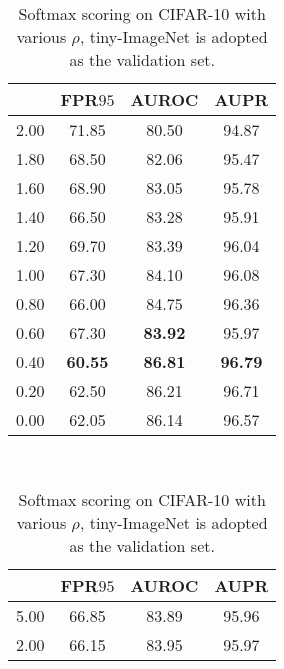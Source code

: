 \documentclass{article}
\begin{document}
\begin{table}[t]
\centering
\parbox{.30\linewidth}{
\centering
\scriptsize
\caption{Softmax scoring on CIFAR-$10$ with various $\sigma_1$, tiny-ImageNet is adopted as the validation set.} \label{tab: 38}
\vspace{5pt}
{
\begin{tabular}{c|ccc}
\toprule[1.5pt]
             & FPR$95$     & AUROC       & AUPR      \\
\midrule[0.6pt]
2.00               & 71.85                  & 80.50                  & 94.87      \\
1.80               & 68.50                  & 82.06                  & 95.47      \\
1.60               & 68.90                  & 83.05                  & 95.78       \\
1.40               & 66.50                  & 83.28                  & 95.91      \\
1.20               & 69.70                  & 83.39                  & 96.04      \\
1.00               & 67.30                  & 84.10                  & 96.08 \\ 
0.80               & 66.00                  & 84.75                  & 96.36 \\
0.60               & {67.30}                  & \textbf{83.92}                  & 95.97 \\ 
\cellcolor{greyC}0.40               & \cellcolor{greyC}\textbf{60.55}                  & \cellcolor{greyC}\textbf{86.81}                  & \cellcolor{greyC}\textbf{96.79}  \\
0.20               & 62.50                  & 86.21                  & 96.71  \\
0.00               & 62.05                  & 86.14                  & 96.57  \\ 
\bottomrule[1.5pt]      
\end{tabular}
}}~~
\parbox{.30\linewidth}{
\centering
\caption{Softmax scoring on CIFAR-10 with various $\rho$, tiny-ImageNet is adopted as the validation set.} 
\scriptsize
\vspace{5pt}
{
\begin{tabular}{c|ccc}
\toprule[1.5pt]
            & FPR$95$     & AUROC      & AUPR      \\
\midrule[0.6pt]
5.00               & 66.85                  & 83.89                  & 95.96       \\
2.00               & 66.15                  & 83.95                  & 95.97       \\

\end{tabular}}}
\end{table}
\end{document}
